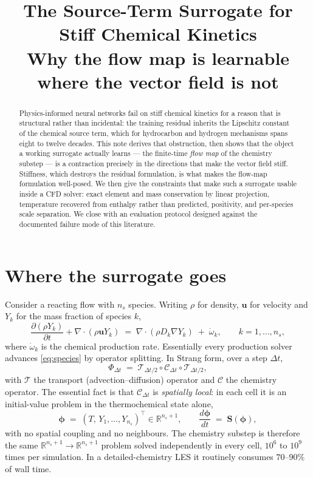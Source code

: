 \documentclass[11pt]{article}
\title{The Source-Term Surrogate for Stiff Chemical Kinetics\\
{\large Why the flow map is learnable where the vector field is not}}
\author{}
\date{}
\newcommand{\R}{\mathbb{R}}
\newcommand{\vv}[1]{\bm{#1}}
\newcommand{\phiv}{\vv{\phi}}
\newcommand{\Sv}{\vv{S}}
\newcommand{\dt}{\Delta t}
\theoremstyle{plain}
\theoremstyle{definition}
\begin{document}
\maketitle

\begin{abstract}
Physics-informed neural networks fail on stiff chemical kinetics for a reason
that is structural rather than incidental: the training residual inherits the
Lipschitz constant of the chemical source term, which for hydrocarbon and
hydrogen mechanisms spans eight to twelve decades. This note derives that
obstruction, then shows that the object a working surrogate actually learns ---
the finite-time \emph{flow map} of the chemistry substep --- is a contraction
precisely in the directions that make the vector field stiff. Stiffness, which
destroys the residual formulation, is what makes the flow-map formulation
well-posed. We then give the constraints that make such a surrogate usable
inside a CFD solver: exact element and mass conservation by linear projection,
temperature recovered from enthalpy rather than predicted, positivity, and
per-species scale separation. We close with an evaluation protocol designed
against the documented failure mode of this literature.
\end{abstract}

\section{Where the surrogate goes}

Consider a reacting flow with $n_s$ species. Writing $\rho$ for density,
$\vv{u}$ for velocity and $Y_k$ for the mass fraction of species $k$,
\begin{equation}
\frac{\partial (\rho Y_k)}{\partial t} + \nabla\cdot(\rho\vv{u}Y_k)
  \;=\; \nabla\cdot\!\left(\rho D_k \nabla Y_k\right) \;+\; \dot\omega_k,
\qquad k = 1,\dots,n_s,
\label{eq:species}
\end{equation}
where $\dot\omega_k$ is the chemical production rate. Essentially every
production solver advances \eqref{eq:species} by operator splitting. In Strang
form, over a step $\dt$,
\begin{equation}
\Phi_{\dt} \;=\; \mathcal{T}_{\dt/2}\circ\mathcal{C}_{\dt}\circ\mathcal{T}_{\dt/2},
\label{eq:strang}
\end{equation}
with $\mathcal{T}$ the transport (advection--diffusion) operator and
$\mathcal{C}$ the chemistry operator. The essential fact is that
$\mathcal{C}_{\dt}$ is \emph{spatially local}: in each cell it is an
initial-value problem in the thermochemical state alone,
\begin{equation}
\phiv \;=\; (T,\,Y_1,\dots,Y_{n_s})^{\!\top} \in \R^{n_s+1},
\qquad
\frac{d\phiv}{dt} \;=\; \Sv(\phiv),
\label{eq:ode}
\end{equation}
with no spatial coupling and no neighbours. The chemistry substep is therefore
the same $\R^{n_s+1}\to\R^{n_s+1}$ problem solved independently in every cell,
$10^6$ to $10^9$ times per simulation. In a detailed-chemistry LES it routinely
consumes $70$--$90\%$ of wall time.
\end{document}
